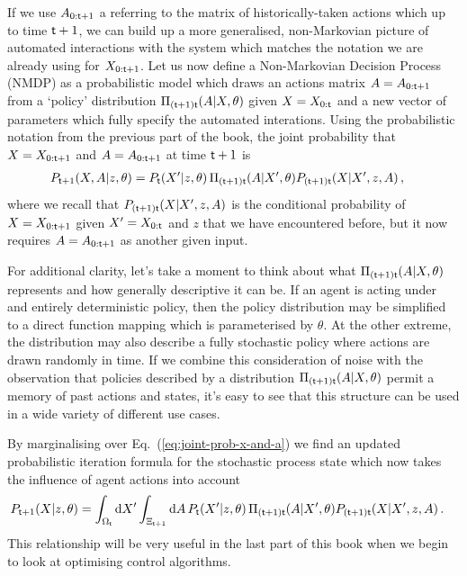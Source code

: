 If we use $A_{0:{\sf t}+1}$ a referring to the matrix of historically-taken actions which up to time ${\sf t}+1$, we can build up a more generalised, non-Markovian picture of automated interactions with the system which matches the notation we are already using for $X_{0:{\sf t}+1}$. Let us now define a Non-Markovian Decision Process (NMDP) as a probabilistic model which draws an actions matrix $A=A_{0:{\sf t}+1}$ from a `policy' distribution $\Pi_{({\sf t}+1){\sf t}}(A\vert X,\theta)$ given $X=X_{0:{\sf t}}$ and a new vector of parameters which fully specify the automated interations. Using the probabilistic notation from the previous part of the book, the joint probability that $X=X_{0:{\sf t}+1}$ and $A=A_{0:{\sf t}+1}$ at time ${\sf t}+1$ is
\begin{align}
P_{{\sf t}+1}(X,A\vert z, \theta ) &= P_{{\sf t}}(X'\vert z,\theta ) \, \Pi_{({\sf t}+1){\sf t}}(A\vert X',\theta)P_{({\sf t}+1){\sf t}}(X\vert X',z,A) \label{eq:joint-prob-x-and-a} \,,
\end{align}
where we recall that $P_{({\sf t}+1){\sf t}}(X\vert X',z,A)$ is the conditional probability of $X=X_{0:{\sf t}+1}$ given $X'=X_{0:{\sf t}}$ and $z$ that we have encountered before, but it now requires $A=A_{0:{\sf t}+1}$ as another given input.

For additional clarity, let's take a moment to think about what $\Pi_{({\sf t}+1){\sf t}}(A\vert X,\theta)$ represents and how generally descriptive it can be. If an agent is acting under and entirely deterministic policy, then the policy distribution may be simplified to a direct function mapping which is parameterised by $\theta$. At the other extreme, the distribution may also describe a fully stochastic policy where actions are drawn randomly in time. If we combine this consideration of noise with the observation that policies described by a distribution $\Pi_{({\sf t}+1){\sf t}}(A\vert X,\theta)$ permit a memory of past actions and states, it's easy to see that this structure can be used in a wide variety of different use cases.

By marginalising over Eq.~(\ref{eq:joint-prob-x-and-a}) we find an updated probabilistic iteration formula for the stochastic process state which now takes the influence of agent actions into account
\begin{align}
P_{{\sf t}+1}(X\vert z,\theta ) &= \int_{\Omega_{{\sf t}}}{\rm d}X' \int_{\Xi_{{\sf t}+1}}{\rm d}A \, P_{{\sf t}}(X'\vert z,\theta ) \, \Pi_{({\sf t}+1){\sf t}}(A\vert X',\theta)P_{({\sf t}+1){\sf t}}(X\vert X',z,A)  \,.
\end{align}
This relationship will be very useful in the last part of this book when we begin to look at optimising control algorithms.

